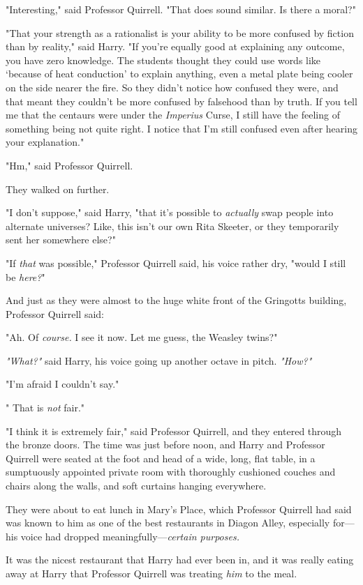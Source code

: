 "Interesting," said Professor Quirrell. "That does sound similar. Is there a
moral?"

"That your strength as a rationalist is your ability to be more confused by
fiction than by reality," said Harry. "If you're equally good at explaining any
outcome, you have zero knowledge. The students thought they could use words
like `because of heat conduction' to explain anything, even a metal plate being
cooler on the side nearer the fire. So they didn't notice how confused they
were, and that meant they couldn't be more confused by falsehood than by truth.
If you tell me that the centaurs were under the \emph{Imperius} Curse, I still
have the feeling of something being not quite right. I notice that I'm still
confused even after hearing your explanation."

"Hm," said Professor Quirrell.

They walked on further.

"I don't suppose," said Harry, "that it's possible to \emph{actually} swap
people into alternate universes? Like, this isn't our own Rita Skeeter, or they
temporarily sent her somewhere else?"

"If \emph{that} was possible," Professor Quirrell said, his voice rather dry,
"would I still be \emph{here?}"

And just as they were almost to the huge white front of the Gringotts building,
Professor Quirrell said:

"Ah. Of \emph{course.} I see it now. Let me guess, the Weasley twins?"

\emph{"What?"} said Harry, his voice going up another octave in pitch.
\emph{"How?"}

"I'm afraid I couldn't say."

"{\el} That is \emph{not} fair."

"I think it is extremely fair," said Professor Quirrell, and they entered
through the bronze doors.
\sbreak
The time was just before noon, and Harry and Professor Quirrell were seated at
the foot and head of a wide, long, flat table, in a sumptuously appointed
private room with thoroughly cushioned couches and chairs along the walls, and
soft curtains hanging everywhere.

They were about to eat lunch in Mary's Place, which Professor Quirrell had said
was known to him as one of the best restaurants in Diagon Alley, especially
for---his voice had dropped meaningfully---\emph{certain purposes.}

It was the nicest restaurant that Harry had ever been in, and it was really
eating away at Harry that Professor Quirrell was treating \emph{him} to the
meal.

